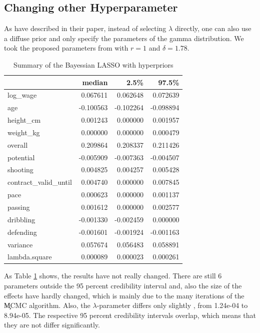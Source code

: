 \documentclass[12pt,a4paper]{article}
\begin{document}
\hypertarget{changing-other-hyperparameter}{%
\subsection{Changing other
Hyperparameter}\label{changing-other-hyperparameter}}

As \textcite{park_bayesian_2008} have described in their paper, instead
of selecting \(\lambda\) directly, one can also use a diffuse prior and
only specify the parameters of the gamma distribution. We took the
proposed parameters from \textcite{park_bayesian_2008} with \(r = 1\)
and \(\delta = 1.78\).

\FloatBarrier
\begin{table}[!h]

\caption{\label{tab:sensity }\label{tab:sum_bay_hy_1} Summary of the  Bayessian LASSO with hyperpriors}
\centering
\begin{tabular}[t]{lrrr}
\toprule
  & median & 2.5\% & 97.5\%\\
\midrule
\rowcolor{gray!6}  log\_wage & 0.067611 & 0.062648 & 0.072639\\
age & -0.100563 & -0.102264 & -0.098894\\
\rowcolor{gray!6}  height\_cm & 0.001243 & 0.000000 & 0.001957\\
weight\_kg & 0.000000 & 0.000000 & 0.000479\\
\rowcolor{gray!6}  overall & 0.209864 & 0.208337 & 0.211426\\
potential & -0.005909 & -0.007363 & -0.004507\\
\rowcolor{gray!6}  shooting & 0.004825 & 0.004257 & 0.005428\\
contract\_valid\_until & 0.004740 & 0.000000 & 0.007845\\
\rowcolor{gray!6}  pace & 0.000623 & 0.000000 & 0.001137\\
passing & 0.001612 & 0.000000 & 0.002577\\
\rowcolor{gray!6}  dribbling & -0.001330 & -0.002459 & 0.000000\\
defending & -0.001601 & -0.001924 & -0.001163\\
\rowcolor{gray!6}  variance & 0.057674 & 0.056483 & 0.058891\\
lambda.square & 0.000089 & 0.000023 & 0.000261\\
\bottomrule
\end{tabular}
\end{table}
\FloatBarrier

As Table \ref{tab:sum_bay_hy_1} shows, the results have not really
changed. There are still 6 parameters outside the 95 percent credibility
interval and, also the size of the effects have hardly changed, which is
mainly due to the many iterations of the \c{MCMC} algorithm. Also, the
\(\lambda\)-parameter differs only slightly , from 1.24e-04 to 8.94e-05.
The respective 95 percent credibility intervals overlap, which means
that they are not differ significantly.
\end{document}
